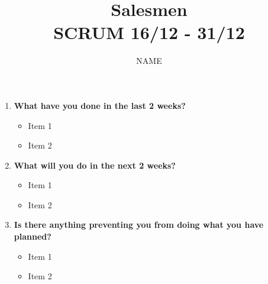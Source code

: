 \documentclass[a4paper, 12pt]{article}
\begin{document}
\title{Salesmen \\ SCRUM 16/12 - 31/12}
\author{NAME}
\date{}

\maketitle


\begin{enumerate}
	
	\item \textbf{What have you done in the last 2 weeks?}
	\begin{itemize}
		\item Item 1
		\item Item 2
		\\
	\end{itemize}
	
	\item \textbf{What will you do in the next 2 weeks?}
	\begin{itemize}
		\item Item 1
		\item Item 2
		\\
	\end{itemize}
	
	\item \textbf{Is there anything preventing you from doing what you have
	planned?}
	\begin{itemize}
		\item Item 1
		\item Item 2
		\\
	\end{itemize}
	
	
\end{enumerate}



		
\end{document}

